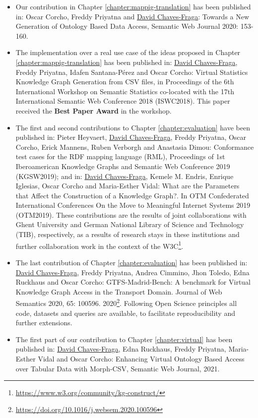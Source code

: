 \begin{itemize}
    \item Our contribution in Chapter \ref{chapter:mappig-translation} has been published in: Oscar Corcho, Freddy Priyatna and \underline{David Chaves-Fraga}: Towards a New Generation of Ontology Based Data Access, Semantic Web Journal 2020: 153-160.
    \item The implementation over a real use case of the ideas proposed in Chapter \ref{chapter:mappig-translation} has been published in: \underline{David Chaves-Fraga}, Freddy Priyatna, Idafen Santana-Pérez and Oscar Corcho: Virtual Statistics Knowledge Graph Generation from CSV files, in Proceedings of the 6th International Workshop on Semantic Statistics co-located with the 17th International Semantic Web Conference 2018 (ISWC2018). This paper received the \textbf{Best Paper Award} in the workshop.
    \item The first and second contributions to Chapter \ref{chapter:evaluation} have been published in: Pieter Heyvaert, \underline{David Chaves-Fraga}, Freddy Priyatna, Oscar Corcho, Erick Mannens, Ruben Verborgh and Anastasia Dimou: Conformance test cases for the RDF mapping language (RML), Proceedings of 1st Iberoamerican Knowledge Graphs and Semantic Web Conference 2019 (KGSW2019); and in: \underline{David Chaves-Fraga}, Kemele M. Endris, Enrique Iglesias, Oscar Corcho and Maria-Esther Vidal: What are the Parameters that Affect the Construction of a Knowledge Graph?. In OTM Confederated International Conferences On the Move to Meaningful Internet Systems 2019 (OTM2019). These contributions are the results of joint collaborations with Ghent University and German National Library of Science and Technology (TIB), respectively, as a results of research stays in these institutions and further collaboration work in the context of the W3C\footnote{\url{https://www.w3.org/community/kg-construct/}}.
    \item The last contribution of Chapter \ref{chapter:evaluation} has been published in: \underline{David Chaves-Fraga}, Freddy Priyatna, Andrea Cimmino, Jhon Toledo, Edna Ruckhaus and Oscar Corcho: GTFS-Madrid-Bench: A benchmark for Virtual Knowledge Graph Access in the Transport Domain. Journal of Web Semantics 2020, 65: 100596. 2020\footnote{\url{https://doi.org/10.1016/j.websem.2020.100596}}. Following Open Science principles all code, datasets and queries are available, to facilitate reproducibility and further extensions.
    \item The first part of our contribution to Chapter \ref{chapter:virtual} has been published in: \underline{David Chaves-Fraga}, Edna Ruckhaus, Freddy Priyatna, Maria-Esther Vidal and Oscar Corcho: Enhancing Virtual Ontology Based Access over Tabular Data with Morph-CSV, Semantic Web Journal, 2021.

\end{itemize}
